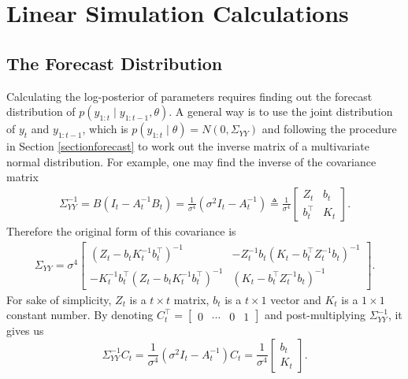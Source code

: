 \setcounter{figure}{1} 

\section{Linear Simulation Calculations}\label{linearcalculation}

\subsection*{The Forecast Distribution} 

Calculating the log-posterior of parameters requires finding out the forecast distribution of $p\left(y_{1:t}\mid y_{1:t-1},\theta\right)$. A general way is to use the joint distribution of $y_{t}$ and $y_{1:t-1}$, which is $p\left(y_{1:t}\mid \theta\right)= N\left(0,\Sigma_{YY}\right)$ and following the procedure in Section \ref{sectionforecast} to work out the inverse matrix of a multivariate normal distribution. For example, one may find the inverse of the covariance matrix 
\begin{align*}
\Sigma_{YY}^{-1} = B\left(I_t-A_t^{-1}B_t\right) =\frac{1}{\sigma^4}\left(\sigma^2 I_t-A_t^{-1}\right) \triangleq \frac{1}{\sigma^4}
\begin{bmatrix} 
Z_{t} & b_{t} \\
b_{t}^\top & K_{t}
\end{bmatrix}.
\end{align*}
Therefore the original form of this covariance is 
\begin{align*} \Sigma_{YY} =\sigma^4 
\begin{bmatrix}
\left(Z_t-b_tK_t^{-1}b_t^\top\right)^{-1} & -Z_t^{-1}b_t\left(K_t-b_t^\top Z_t^{-1}b_t\right)^{-1}\\
-K_t^{-1}b_t^\top \left(Z_t-b_tK_t^{-1}b_t^\top\right)^{-1} & \left(K_t-b_t^\top Z_t^{-1}b_t\right)^{-1}
\end{bmatrix}.
\end{align*}
For sake of simplicity, $Z_t$ is a $t\times t$ matrix, $b_t$ is a $t \times 1$ vector and $K_t$ is a $1\times 1$ constant number. By denoting $C_{t}^\top = \begin{bmatrix} 0 & \cdots & 0 & 1\end{bmatrix}$ and post-multiplying $\Sigma_{YY}^{-1}$, it gives us 
\begin{equation}
\Sigma_{YY}^{-1} C_{t}= \frac{1}{\sigma^4}\left(\sigma^2 I_t-A_t^{-1}\right) C_{t}= \frac{1}{\sigma^4} \begin{bmatrix} b_{t} \\ K_{t} \end{bmatrix}.
\end{equation} 

